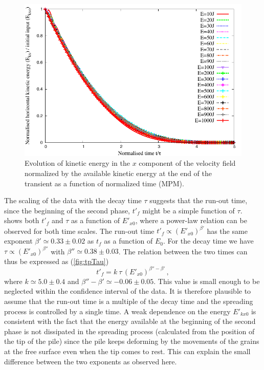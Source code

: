 \begin{figure}[tbhp]
\centering
\includegraphics[width=\textwidth]{EkxKoTTau_Slope}
\caption[Evolution of the normalised horizontal kinetic energy as function of 
the normalised time since the transient phase]{Evolution of kinetic energy in 
the $x$ component of 
the velocity field  normalized by the available kinetic energy at the end of 
the transient as a function of normalized time (MPM).}
\label{fig:ExEx0_vs_ttau}
\end{figure}


The scaling of the data with the decay time $\tau$ suggests that the 
run-out time, since the beginning of the second phase, $t'_f$ might be a simple 
function of $\tau$.~ shows both $t'_f$ and $\tau$ as 
a function of $E'_{x0}$, where a power-law relation can be observed for both 
time scales. The run-out time $t'_f \propto (E'_{x0})^{\beta'}$ has the 
same exponent $\beta' \simeq 0.33 \pm 0.02$ as $t_f$ as a function of $E_0$. 
For the decay time we have $\tau \propto (E'_{x0})^{\beta''}$ with $\beta'' 
\simeq 0.38 \pm 0.03$. The relation between the two times can thus be expressed 
as (\cref{fig:tpTau})
\begin{equation}
t'_f = k  \ \tau \, (E'_{x0})^{\beta'' - \beta'} \,,
\label{eqn:t'f}
\end{equation}
where $k \simeq 5.0 \pm 0.4$ and $\beta'' - \beta' \simeq -0.06 \pm 0.05$. This 
value is small enough to be neglected within the confidence interval of the 
data. It is therefore plausible to assume that the run-out time is a multiple 
of the decay time and the spreading process is controlled by a single time. A 
weak dependence on the energy $E'_{kx0}$ is consistent with the fact that the  
energy available at the beginning of the second phase is not dissipated in the 
spreading process (calculated from the position of the tip of the pile) since  
the pile keeps deforming by the movements of the grains at the free surface 
even when the tip comes to rest. This can explain the small difference between 
the two exponents as observed here.


